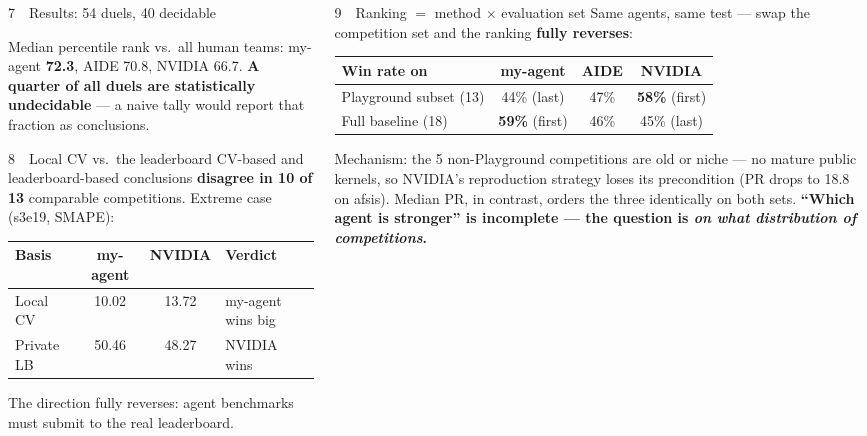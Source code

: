 \documentclass[final]{beamer}
\newcommand{\highlight}[1]{\textcolor{accent}{\textbf{#1}}}
\begin{document}
\begin{frame}[t]
\begin{columns}[t]
\begin{column}{0.315\textwidth}
\begin{block}{7~~Results: 54 duels, 40 decidable}
\vspace{0.8ex}
\raggedright
Median percentile rank vs.\ all human teams: my-agent \textbf{72.3}, AIDE 70.8, NVIDIA 66.7. \highlight{A quarter of all duels are statistically undecidable} --- a naive tally would report that fraction as conclusions.
\end{block}

\begin{block}{8~~Local CV vs.\ the leaderboard}
CV-based and leaderboard-based conclusions \highlight{disagree in 10 of 13} comparable competitions. Extreme case (s3e19, SMAPE):
\begin{center}
\small
\begin{tabular}{@{}lccl@{}}
\toprule
Basis & my-agent & NVIDIA & Verdict \\
\midrule
Local CV & 10.02 & 13.72 & my-agent wins big \\
Private LB & 50.46 & 48.27 & NVIDIA wins \\
\bottomrule
\end{tabular}
\end{center}
The direction fully reverses: agent benchmarks must submit to the real leaderboard.
\end{block}

\end{column}

\begin{column}{0.315\textwidth}

\begin{block}{9~~Ranking $=$ method $\times$ evaluation set}
Same agents, same test --- swap the competition set and the ranking \highlight{fully reverses}:
\begin{center}
\begin{tabular}{@{}lccc@{}}
\toprule
\textbf{Win rate on} & \textbf{my-agent} & \textbf{AIDE} & \textbf{NVIDIA} \\
\midrule
Playground subset (13) & 44\% (last) & 47\% & \textbf{58\%} (first) \\
Full baseline (18) & \textbf{59\%} (first) & 46\% & 45\% (last) \\
\bottomrule
\end{tabular}
\end{center}
\vspace{0.5ex}
Mechanism: the 5 non-Playground competitions are old or niche --- no mature public kernels, so NVIDIA's reproduction strategy loses its precondition (PR drops to 18.8 on afsis). Median PR, in contrast, orders the three identically on both sets. \textbf{``Which agent is stronger'' is incomplete --- the question is \emph{on what distribution of competitions}.}
\end{block}


\end{column}
\end{columns}
\end{frame}
\end{document}
